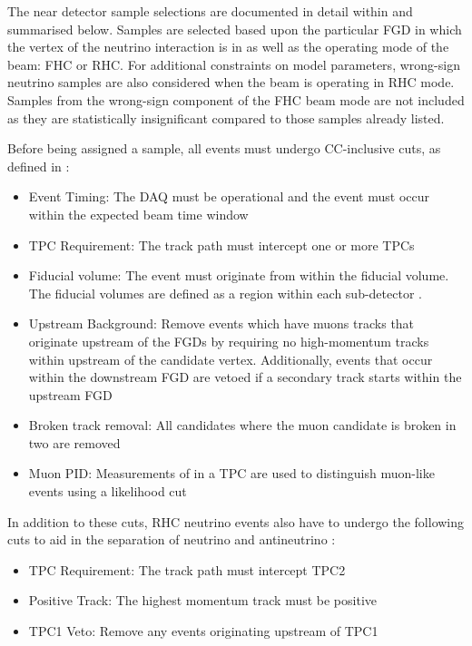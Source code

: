 The near detector sample selections are documented in detail within \cite{t2k_tn_395} and summarised below. Samples are selected based upon the particular FGD in which the vertex of the neutrino interaction is in as well as the operating mode of the beam: FHC or RHC. For additional constraints on model parameters, wrong-sign neutrino samples are also considered when the beam is operating in RHC mode. Samples from the wrong-sign component of the FHC beam mode are not included as they are statistically insignificant compared to those samples already listed.

Before being assigned a sample, all events must undergo CC-inclusive cuts, as defined in \cite{t2k_tn_212}:

\begin{itemize}
\item Event Timing: The DAQ must be operational and the event must occur within the expected beam time window
\item TPC Requirement: The track path must intercept one or more TPCs
\item Fiducial volume: The event must originate from within the fiducial volume. The fiducial volumes are defined as a region within each sub-detector \cite{thesis_will}.
\item Upstream Background: Remove events which have muons tracks that originate upstream of the FGDs by requiring no high-momentum tracks within  upstream of the candidate vertex. Additionally, events that occur within the downstream FGD are vetoed if a secondary track starts within the upstream FGD
\item Broken track removal: All candidates where the muon candidate is broken in two are removed
\item Muon PID: Measurements of  in a TPC are used to distinguish muon-like events using a likelihood cut
\end{itemize}

In addition to these cuts, RHC neutrino events also have to undergo the following cuts to aid in the separation of neutrino and antineutrino \cite{t2k_tn_246}:

\begin{itemize}
\item TPC Requirement: The track path must intercept TPC2
\item Positive Track: The highest momentum track must be positive
\item TPC1 Veto: Remove any events originating upstream of TPC1
\end{itemize}


